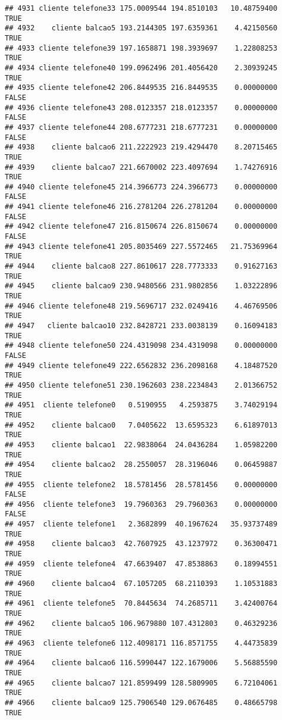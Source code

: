 \documentclass[
]{article}
\begin{document}
\begin{verbatim}
## 4931 cliente telefone33 175.0009544 194.8510103   10.48759400     TRUE
## 4932    cliente balcao5 193.2144305 197.6359361    4.42150560     TRUE
## 4933 cliente telefone39 197.1658871 198.3939697    1.22808253     TRUE
## 4934 cliente telefone40 199.0962496 201.4056420    2.30939245     TRUE
## 4935 cliente telefone42 206.8449535 216.8449535    0.00000000    FALSE
## 4936 cliente telefone43 208.0123357 218.0123357    0.00000000    FALSE
## 4937 cliente telefone44 208.6777231 218.6777231    0.00000000    FALSE
## 4938    cliente balcao6 211.2222923 219.4294470    8.20715465     TRUE
## 4939    cliente balcao7 221.6670002 223.4097694    1.74276916     TRUE
## 4940 cliente telefone45 214.3966773 224.3966773    0.00000000    FALSE
## 4941 cliente telefone46 216.2781204 226.2781204    0.00000000    FALSE
## 4942 cliente telefone47 216.8150674 226.8150674    0.00000000    FALSE
## 4943 cliente telefone41 205.8035469 227.5572465   21.75369964     TRUE
## 4944    cliente balcao8 227.8610617 228.7773333    0.91627163     TRUE
## 4945    cliente balcao9 230.9480566 231.9802856    1.03222896     TRUE
## 4946 cliente telefone48 219.5696717 232.0249416    4.46769506     TRUE
## 4947   cliente balcao10 232.8428721 233.0038139    0.16094183     TRUE
## 4948 cliente telefone50 224.4319098 234.4319098    0.00000000    FALSE
## 4949 cliente telefone49 222.6562832 236.2098168    4.18487520     TRUE
## 4950 cliente telefone51 230.1962603 238.2234843    2.01366752     TRUE
## 4951  cliente telefone0   0.5190955   4.2593875    3.74029194     TRUE
## 4952    cliente balcao0   7.0405622  13.6595323    6.61897013     TRUE
## 4953    cliente balcao1  22.9838064  24.0436284    1.05982200     TRUE
## 4954    cliente balcao2  28.2550057  28.3196046    0.06459887     TRUE
## 4955  cliente telefone2  18.5781456  28.5781456    0.00000000    FALSE
## 4956  cliente telefone3  19.7960363  29.7960363    0.00000000    FALSE
## 4957  cliente telefone1   2.3682899  40.1967624   35.93737489     TRUE
## 4958    cliente balcao3  42.7607925  43.1237972    0.36300471     TRUE
## 4959  cliente telefone4  47.6639407  47.8538863    0.18994551     TRUE
## 4960    cliente balcao4  67.1057205  68.2110393    1.10531883     TRUE
## 4961  cliente telefone5  70.8445634  74.2685711    3.42400764     TRUE
## 4962    cliente balcao5 106.9679880 107.4312803    0.46329236     TRUE
## 4963  cliente telefone6 112.4098171 116.8571755    4.44735839     TRUE
## 4964    cliente balcao6 116.5990447 122.1679006    5.56885590     TRUE
## 4965    cliente balcao7 121.8599499 128.5809905    6.72104061     TRUE
## 4966    cliente balcao9 125.7906540 129.0676485    0.48665798     TRUE

\end{verbatim}
\end{document}
